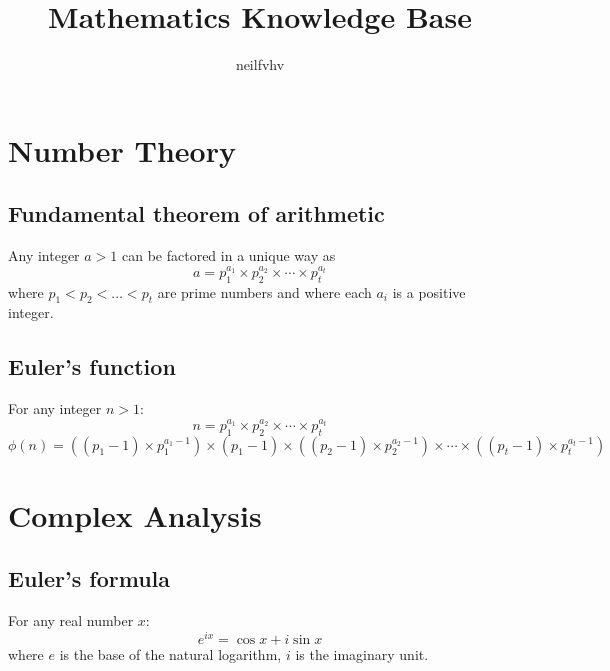 \documentclass[a4paper, 11pt]{article}
\title{Mathematics Knowledge Base}
\author{neilfvhv}
\begin{document}
\maketitle

\section{Number Theory}

    \subsection{Fundamental theorem of arithmetic}
        Any integer $a > 1$ can be factored in a unique way as
        $$
            a = p_1^{a_1} \times p_2^{a_2} \times \cdots \times p_t^{a_t}
        $$
        where $p_1 < p_2 < \ldots < p_t$ are prime numbers and where each $a_i$ is a positive integer.

	\subsection{Euler's function}
		For any integer $n > 1$:
		$$
			n = p_1^{a_1} \times p_2^{a_2} \times \cdots \times p_t^{a_t}
		$$
        $$
            \phi{(n)} =  ((p_1 - 1) \times p_1^{a_1 - 1}) \times (p_1 - 1) \times ((p_2 - 1) \times p_2^{a_2 - 1}) \times \cdots \times ((p_t - 1) \times p_t^{a_t - 1})
        $$
        

\section{Complex Analysis}

    \subsection{Euler's formula}
        For any real number $x$:
        $$
            e^{i x} = \cos{x} + i \sin{x}
        $$
        where $e$ is the base of the natural logarithm, $i$ is the imaginary unit.
\end{document}
